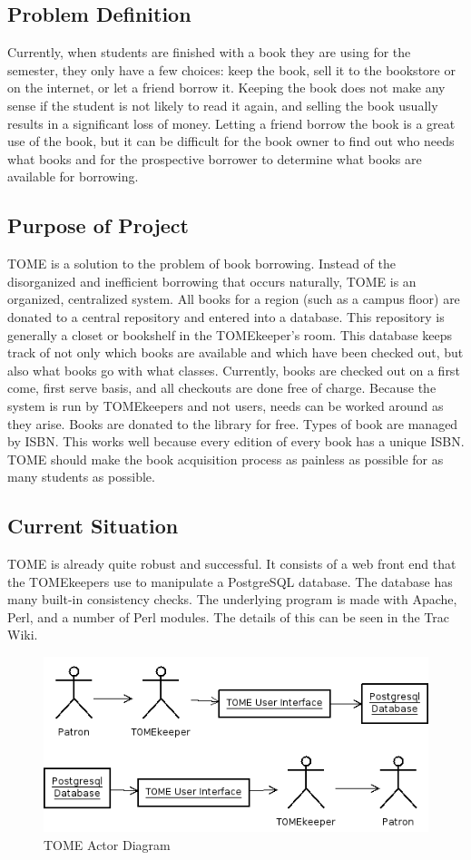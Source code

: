 \documentclass[12pt,titlepage]{article}
\begin{document}
\subsection{Problem Definition}
Currently, when students are finished with a book they are using for the semester, they only have a few choices: keep the book, sell it to the bookstore or on the internet, or let a friend borrow it.  Keeping the book does not make any sense if the student is not likely to read it again, and selling the book usually results in a significant loss of money.  Letting a friend borrow the book is a great use of the book, but it can be difficult for the book owner to find out who needs what books and for the prospective borrower to determine what books are available for borrowing.
\subsection{Purpose of Project}
TOME is a solution to the problem of book borrowing.  Instead of the disorganized and inefficient borrowing that occurs naturally, TOME is an organized, centralized system.  All books for a region (such as a campus floor) are donated to a central repository and entered into a database.  This repository is generally a closet or bookshelf in the TOMEkeeper's room.  This database keeps track of not only which books are available and which have been checked out, but also what books go with what classes.  Currently, books are checked out on a first come, first serve basis, and all checkouts are done free of charge.  Because the system is run by TOMEkeepers and not users, needs can be worked around as they arise.  Books are donated to the library for free.  Types of book are managed by ISBN.  This works well because every edition of every book has a unique ISBN.  TOME should make the book acquisition process as painless as possible for as many students as possible.
\subsection{Current Situation}
TOME is already quite robust and successful.  It consists of a web front end that the TOMEkeepers use to manipulate a PostgreSQL database.  The database has many built-in consistency checks.  The underlying program is made with Apache, Perl, and a number of Perl modules.  The details of this can be seen in the Trac Wiki.
\begin{figure}[h]
	\includegraphics[width=\textwidth]{userdiagram}
	\caption{TOME Actor Diagram}
\end{figure}
\end{document}
